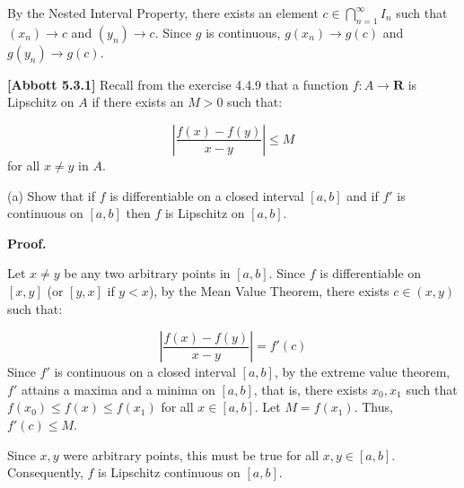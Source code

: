 \documentclass[10pt]{article}
\begin{document}
By the Nested Interval Property, there exists an element $\displaystyle c\in \bigcap _{n=1}^{\infty } I_{n}$ such that $\displaystyle ( x_{n})\rightarrow c$ and $\displaystyle ( y_{n})\rightarrow c$. Since $\displaystyle g$ is continuous, $\displaystyle g( x_{n})\rightarrow g( c)$ and $\displaystyle g( y_{n})\rightarrow g( c)$. 



\textbf{[Abbott 5.3.1]} Recall from the exercise 4.4.9 that a function $\displaystyle f:A\rightarrow \mathbf{R}$ is Lipschitz on $\displaystyle A$ if there exists an $\displaystyle M >0$ such that:


\begin{equation*}
\left| \frac{f( x) -f( y)}{x-y}\right| \leq M
\end{equation*}
for all $\displaystyle x\neq y$ in $\displaystyle A$.



(a) Show that if $\displaystyle f$ is differentiable on a closed interval $\displaystyle [ a,b]$ and if $\displaystyle f'$ is continuous on $\displaystyle [ a,b]$ then $\displaystyle f$ is Lipschitz on $\displaystyle [ a,b]$.



\textbf{Proof.}



Let $\displaystyle x\neq y$ be any two arbitrary points in $\displaystyle [ a,b]$. Since $\displaystyle f$ is differentiable on $\displaystyle [ x,y]$ (or $\displaystyle [ y,x]$ if $\displaystyle y< x$), by the Mean Value Theorem, there exists $\displaystyle c\in ( x,y)$ such that:


\begin{equation*}
\left| \frac{f( x) -f( y)}{x-y}\right| =f'( c)
\end{equation*}
Since $\displaystyle f'$ is continuous on a closed interval $\displaystyle [ a,b]$, by the extreme value theorem, $\displaystyle f'$ attains a maxima and a minima on $\displaystyle [ a,b]$, that is, there exists $\displaystyle x_{0} ,x_{1}$ such that $\displaystyle f( x_{0}) \leq f( x) \leq f( x_{1})$ for all $\displaystyle x\in [ a,b]$. Let $\displaystyle M=f( x_{1})$. Thus, $\displaystyle f'( c) \leq M$.



Since $\displaystyle x,y$ were arbitrary points, this must be true for all $\displaystyle x,y\in [ a,b]$. Consequently, $\displaystyle f$ is Lipschitz continuous on $\displaystyle [ a,b]$.
\end{document}
